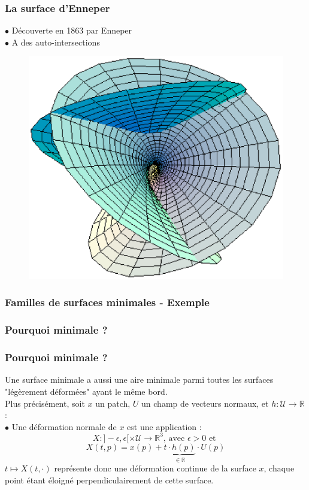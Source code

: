 \documentclass{beamer}
\newcommand{\R}{\mathbb{R}}
\begin{document}
\begin{frame}
\frametitle{La surface d'Enneper}
$\bullet$ Découverte en 1863 par Enneper\\
$\bullet$ A des auto-intersections
\begin{figure}[h!]
      \centering 
      \includegraphics[scale=0.42]{5.eps}
\end{figure}
\end{frame}

\begin{frame}
\frametitle{Familles de surfaces minimales - Exemple}
\begin{center}
\end{center}
\end{frame}

\subsubsection{Pourquoi minimale ?}

\begin{frame}
\frametitle{Pourquoi minimale ?}
Une surface minimale a aussi une aire minimale parmi toutes les surfaces "légèrement déformées" ayant le même bord. \\
\pause
Plus précisément, soit $x$ un patch, $U$ un champ de vecteurs normaux, et $h:\mathscr{U}\rightarrow \R$ :\\
$\bullet$ Une déformation normale de $x$ est une application : 
$$X:]-\epsilon , \epsilon[\times \mathscr{U} \rightarrow \R^3\text{, avec } \epsilon >0 \text{ et } $$ 
$$ X(t, p) = x(p)+\underbrace{t\cdot h(p)}_{\in \R}\cdot U(p)$$
\pause
$t\mapsto X(t, \cdot)$ représente donc une déformation continue de la surface $x$, chaque point étant éloigné perpendiculairement de cette surface.
\end{frame}
\end{document}
